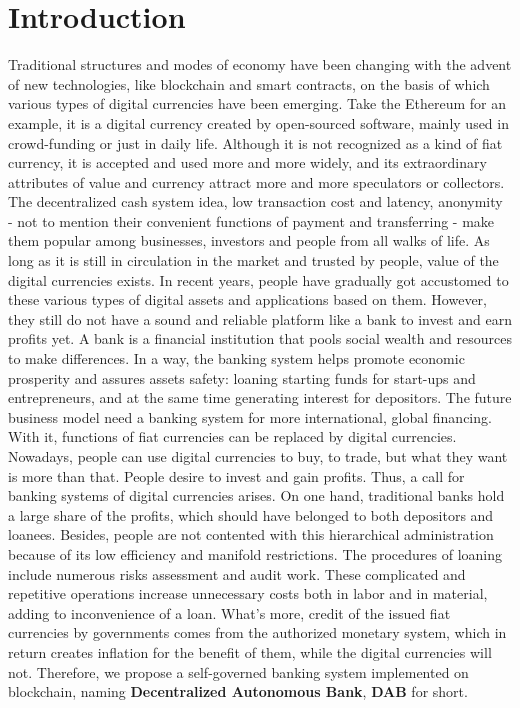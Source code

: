 \documentclass[review]{elsarticle}
\begin{document}
\section{Introduction}
Traditional structures and modes of economy have been changing with the advent of new technologies, like blockchain and smart contracts, on the basis of which various types of digital currencies have been emerging. Take the Ethereum for an example, it is a digital currency created by open-sourced software, mainly used in crowd-funding or just in daily life. Although it is not recognized as a kind of fiat currency, it is accepted and used more and more widely, and its extraordinary attributes of value and currency attract more and more speculators or collectors. The decentralized cash system idea, low transaction cost and latency, anonymity - not to mention their convenient functions of payment and transferring - make them popular among businesses, investors and people from all walks of life. As long as it is still in circulation in the market and trusted by people, value of the digital currencies exists.
In recent years, people have gradually got accustomed to these various types of digital assets and applications based on them. However, they still do not have a sound and reliable platform like a bank to invest and earn profits yet. A bank is a financial institution that pools social wealth and resources to make differences. In a way, the banking system helps promote economic prosperity and assures assets safety: loaning starting funds for start-ups and entrepreneurs, and at the same time generating interest for depositors. The future business model need a banking system for more international, global financing. With it, functions of fiat currencies can be replaced by digital currencies. Nowadays, people can use digital currencies to buy, to trade, but what they want is more than that. People desire to invest and gain profits. Thus, a call for banking systems of digital currencies arises.
On one hand, traditional banks hold a large share of the profits, which should have belonged to both depositors and loanees. Besides, people are not contented with this hierarchical administration because of its low efficiency and manifold restrictions. The procedures of loaning include numerous risks assessment and audit work. These complicated and repetitive operations increase unnecessary costs both in labor and in material, adding to inconvenience of a loan. What's more, credit of the issued fiat currencies by governments comes from the authorized monetary system, which in return creates inflation for the benefit of them, while the digital currencies will not. Therefore, we propose a self-governed banking system implemented on blockchain, naming \textbf{Decentralized Autonomous Bank}, \textbf{DAB} for short.
\end{document}
